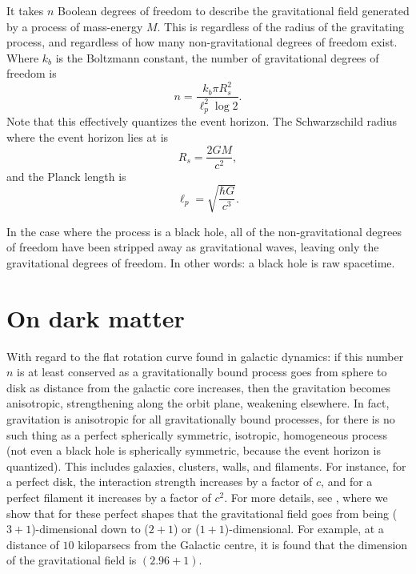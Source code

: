 \documentclass[12pt]{article}
\begin{document}
It takes $n$ Boolean degrees of freedom to describe the gravitational field \cite{hooft, susskind} generated by a process of mass-energy $M$.
This is regardless of the radius of the gravitating process, and regardless of how many non-gravitational degrees of freedom exist.
Where $k_b$ is the Boltzmann constant, the number of gravitational degrees of freedom is
\begin{equation}
n = \frac{k_b \pi R_s^2}{ \ell_p^2 \log 2}.
\end{equation}
Note that this effectively quantizes the event horizon.
The Schwarzschild radius where the event horizon lies at is
\begin{equation}
R_s = \frac{2GM}{c^2},
\end{equation}
and the Planck length is
\begin{equation}
\ell_p = \sqrt{\frac{\hbar G}{c^3}}.
\end{equation}

In the case where the process is a black hole, all of the non-gravitational degrees of freedom have been stripped away as gravitational waves, leaving only the gravitational degrees of freedom.
In other words: a black hole is raw spacetime.






\section{On dark matter}

With regard to the flat rotation curve found in galactic dynamics: if this number $n$ is at least conserved as a gravitationally bound process goes from sphere to disk as distance from the galactic core increases, then the gravitation becomes anisotropic, strengthening along the orbit plane, weakening elsewhere.
In fact, gravitation is anisotropic for all gravitationally bound processes, for there is no such thing as a perfect spherically symmetric, isotropic, homogeneous process (not even a black hole is spherically symmetric, because the event horizon is quantized).
This includes galaxies, clusters, walls, and filaments.
For instance, for a perfect disk, the interaction strength increases by a factor of $c$, and for a perfect filament it increases by a factor of $c^2$.
For more details, see \cite{halayka}, where we show that for these perfect shapes that the gravitational field goes from being ($3+1$)-dimensional down to ($2+1$) or ($1+1$)-dimensional.
For example, at a distance of $10$ kiloparsecs from the Galactic centre, it is found that the dimension of the gravitational field is $(2.96 + 1)$.
\end{document}
